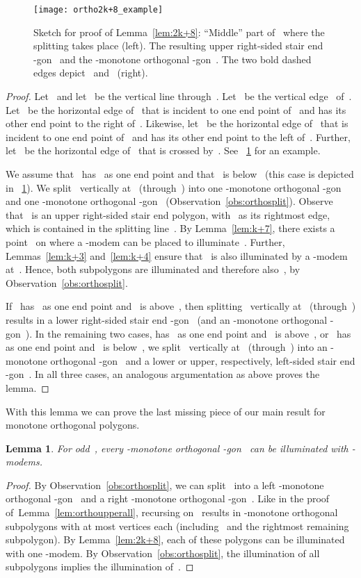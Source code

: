 \documentclass[A4]{article}
\newtheorem{lemma}[theorem]{Lemma}
\begin{document}
\begin{figure}[htb]
  \centering
  \texttt{[image: ortho2k+8\_example]}
  \caption{Sketch for proof of Lemma~\ref{lem:2k+8}:
	  ``Middle'' part of~ where the splitting takes place (left).
      The resulting upper right-sided stair end -gon~ and the -monotone orthogonal -gon~. The two bold dashed edges depict~ and~ (right).}
 \label{fig:ortho2k+8}
\end{figure}

\begin{proof}
Let~ and let~ be the vertical line through~.
Let~ be the vertical edge~ of~.
Let~ be the horizontal edge of~ that is incident to one end point of~ and has its other end point to the right of~.
Likewise, let~ be the horizontal edge of~ that is incident to one end point of~ and has its other end point to the left of~.
Further, let~ be the horizontal edge of~ that is crossed by~.
See \figurename~\ref{fig:ortho2k+8} for an example. 

We assume that~ has~ as one end point and that~ is below~ (this case is depicted in \figurename~\ref{fig:ortho2k+8}).
We split~ vertically at~ (through~) into one -monotone orthogonal -gon~ and one -monotone orthogonal -gon~ (Observation~\ref{obs:orthosplit}).
Observe that~ is an upper right-sided stair end polygon, with~ as its rightmost edge, which is contained in the splitting line~.
By Lemma~\ref{lem:k+7}, there exists a point~ on  where a \mbox{-modem} can be placed to illuminate~.
Further, Lemmas~\ref{lem:k+3} and~\ref{lem:k+4} ensure that~ is also illuminated by a \mbox{-modem} at~.
Hence, both subpolygons are illuminated and therefore also~, by Observation~\ref{obs:orthosplit}.

If~ has~ as one end point and~ is above~, then splitting~ vertically at~ (through~) results in a lower right-sided stair end -gon~ (and an -monotone orthogonal -gon~).
In the remaining two cases,  has~ as one end point and~ is above~, or~ has~ as one end point and~ is below~, we split~ vertically at~ (through~) into an -monotone orthogonal -gon~ and a lower or upper, respectively, left-sided stair end -gon~.
In all three cases, an analogous argumentation as above proves the lemma. \end{proof}

With this lemma we can prove the last missing piece of our main result for monotone orthogonal polygons.

\begin{lemma}\label{lem:orthoupperodd}
For odd~, every -monotone orthogonal -gon~ can be illuminated with  \mbox{-modems}.
\end{lemma}
\begin{proof}
By Observation~\ref{obs:orthosplit}, we can split~ into a left -monotone orthogonal -gon~ and a right -monotone orthogonal -gon~.
Like in the proof of~Lemma~\ref{lem:orthoupperall}, recursing on~ results in  -monotone orthogonal subpolygons with at most  vertices each (including~ and the rightmost remaining subpolygon).
By Lemma~\ref{lem:2k+8}, each of these polygons can be illuminated with one \mbox{-modem}.
By Observation~\ref{obs:orthosplit}, the illumination of all subpolygons implies the illumination of~. \end{proof}
\end{document}
